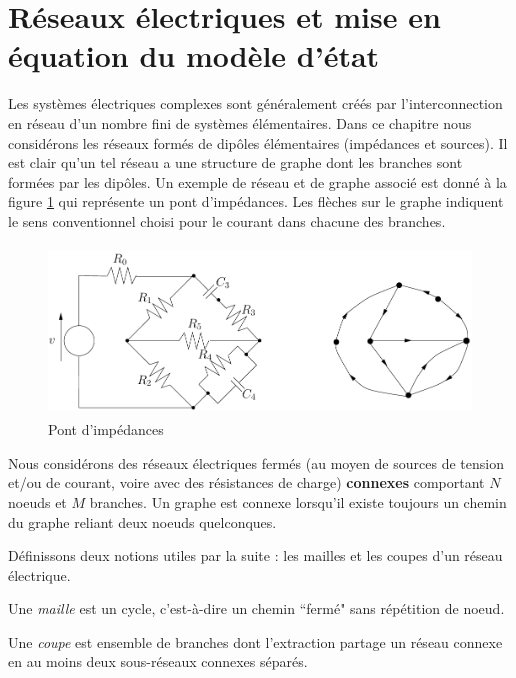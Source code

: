 \section{Réseaux électriques et mise en équation du modèle d'état}

Les systèmes électriques complexes sont généralement créés par l'interconnection en réseau d'un nombre fini de systèmes élémentaires. Dans ce chapitre nous considérons les réseaux formés de  dipôles élémentaires (impédances et sources). Il est clair qu'un tel
réseau a une structure de graphe dont les branches sont formées
par les dip{ô}les. Un exemple de réseau
et de graphe  associé est donné à la figure
\ref{fig:exemplereseau} qui représente un pont d'impédances. Les flèches sur le graphe indiquent le sens conventionnel choisi pour le courant dans chacune des branches. 
\begin{figure}[t]
\begin{center}
\includegraphics[height=45mm]{exemplereseau}
\caption{Pont d'impédances}
\label{fig:exemplereseau}
\end{center}
\end{figure}
Nous considérons des réseaux électriques fermés (au moyen de sources de tension et/ou de courant, voire avec des résistances de charge) {\bf connexes} 
comportant $N$ noeuds et $M$ branches. 
Un graphe est connexe lorsqu'il existe toujours un chemin du graphe reliant deux
noeuds quelconques.

Définissons deux notions utiles par la suite : les
mailles et les coupes d'un réseau électrique.
\begin{description}
\item Une {\em maille} est un cycle, c'est-à-dire un chemin ``fermé" sans répétition de noeud.
\item Une {\em coupe} est ensemble  de branches dont
l'extraction partage un réseau connexe en au moins deux sous-réseaux connexes séparés.
\end{description}

